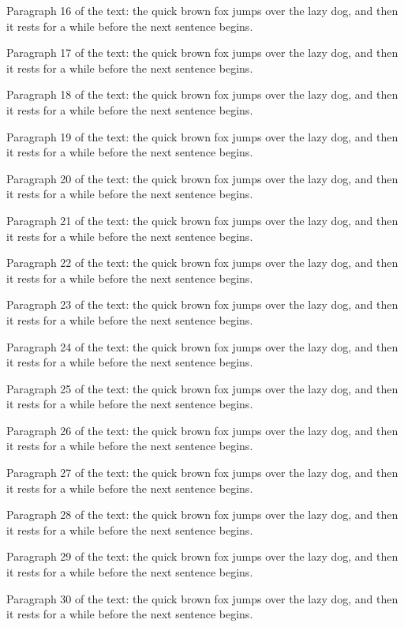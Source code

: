 \documentclass{article}
\begin{document}
Paragraph 16 of the text: the quick brown fox jumps over the lazy dog, and then it rests for a while before the next sentence begins.

Paragraph 17 of the text: the quick brown fox jumps over the lazy dog, and then it rests for a while before the next sentence begins.

Paragraph 18 of the text: the quick brown fox jumps over the lazy dog, and then it rests for a while before the next sentence begins.

Paragraph 19 of the text: the quick brown fox jumps over the lazy dog, and then it rests for a while before the next sentence begins.

Paragraph 20 of the text: the quick brown fox jumps over the lazy dog, and then it rests for a while before the next sentence begins.

Paragraph 21 of the text: the quick brown fox jumps over the lazy dog, and then it rests for a while before the next sentence begins.

Paragraph 22 of the text: the quick brown fox jumps over the lazy dog, and then it rests for a while before the next sentence begins.

Paragraph 23 of the text: the quick brown fox jumps over the lazy dog, and then it rests for a while before the next sentence begins.

Paragraph 24 of the text: the quick brown fox jumps over the lazy dog, and then it rests for a while before the next sentence begins.

Paragraph 25 of the text: the quick brown fox jumps over the lazy dog, and then it rests for a while before the next sentence begins.

Paragraph 26 of the text: the quick brown fox jumps over the lazy dog, and then it rests for a while before the next sentence begins.

Paragraph 27 of the text: the quick brown fox jumps over the lazy dog, and then it rests for a while before the next sentence begins.

Paragraph 28 of the text: the quick brown fox jumps over the lazy dog, and then it rests for a while before the next sentence begins.

Paragraph 29 of the text: the quick brown fox jumps over the lazy dog, and then it rests for a while before the next sentence begins.

Paragraph 30 of the text: the quick brown fox jumps over the lazy dog, and then it rests for a while before the next sentence begins.
\end{document}
